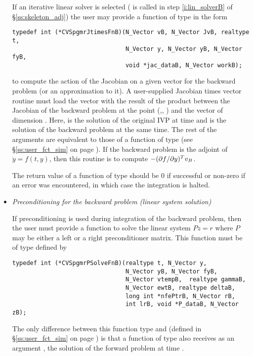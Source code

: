 \begin{itemize}
  If an iterative {\spgmr} linear solver is selected ( is called in step 
  \ref{i:lin_solverB} of \S\ref{ss:skeleton_adj}) the user may provide a function
  of type  in the form 
\begin{verbatim}
typedef int (*CVSpgmrJtimesFnB)(N_Vector vB, N_Vector JvB, realtype t, 
                                N_Vector y, N_Vector yB, N_Vector fyB,
                                void *jac_dataB, N_Vector workB);
\end{verbatim}
  to compute the action of the Jacobian on a given vector  for
  the backward problem (or an approximation to it).
  A user-supplied Jacobian times vector routine must load the vector 
  with the result of the product between the Jacobian of the backward problem 
  at the point (,, ) and the vector  of dimension 
  . Here,  is the solution of the original IVP at time  and 
   is the solution of the backward problem at the same time.  
  The rest of the arguments are equivalent to those of a function of type
   (see \S\ref{ss:user_fct_sim} on page \pageref{p:jtimes}).
  If the backward problem is the adjoint of ${\dot y} = f(t, y)$, then this 
  routine is to compute $-(\partial f / \partial y)^T v_B$.

  The return value of a function of type  should be
  $0$ if successful or non-zero if an error was encountered, in which case
  the integration is halted.

\item {\em Preconditioning for the backward problem
    (linear system solution)}

  If preconditioning is used during integration of the backward problem, 
  then the user must provide a {\C} function to solve the linear system 
  $Pz = r$ where $P$ may be either a left or a right preconditioner matrix.
  This function must be of type  defined by
\begin{verbatim}
typedef int (*CVSpgmrPSolveFnB)(realtype t, N_Vector y, 
                                N_Vector yB, N_Vector fyB, 
                                N_Vector vtempB,  realtype gammaB, 
                                N_Vector ewtB, realtype deltaB, 
                                long int *nfePtrB, N_Vector rB, 
                                int lrB, void *P_dataB, N_Vector zB);
\end{verbatim}
  The only difference between this function type and 
  (defined in \S\ref{ss:user_fct_sim} on page \pageref{p:psolve}) is that
  a function of type  also receives as an argument
  , the solution of the forward problem at time .


\end{itemize}
